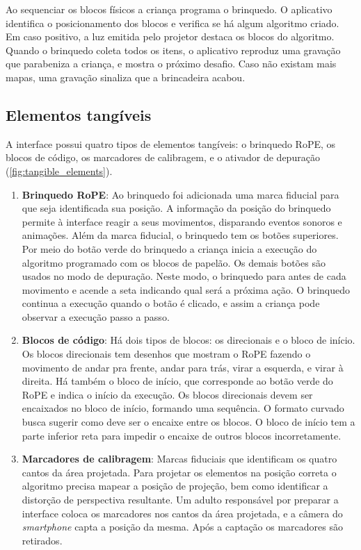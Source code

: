 Ao sequenciar os blocos físicos a criança programa o brinquedo. O aplicativo identifica o posicionamento dos blocos e verifica se há algum algoritmo criado. Em caso positivo, a luz emitida pelo projetor destaca os blocos do algoritmo. Quando o brinquedo coleta todos os itens, o aplicativo reproduz uma gravação que parabeniza a criança, e mostra o próximo desafio. Caso não existam mais mapas, uma gravação sinaliza que a brincadeira acabou.

\subsection{Elementos tangíveis}
A interface possui quatro tipos de elementos tangíveis: o brinquedo RoPE, os blocos de código, os marcadores de calibragem, e o ativador de depuração  (\autoref{fig:tangible_elements}).
\begin{enumerate}
\item \textbf{Brinquedo RoPE}: Ao brinquedo foi adicionada uma marca fiducial para que seja identificada sua posição. A informação da posição do brinquedo permite à interface reagir a seus movimentos, disparando eventos sonoros e animações. Além da marca fiducial, o brinquedo tem os botões superiores. Por meio do botão verde do brinquedo a criança inicia a execução do algoritmo programado com os blocos de papelão. Os demais botões são usados no modo de depuração. Neste modo, o brinquedo para antes de cada movimento e acende a seta indicando qual será a próxima ação. O brinquedo continua a execução quando o botão é clicado, e assim a criança pode observar a execução passo a passo.
\item \textbf{Blocos de código}:  Há dois tipos de blocos: os direcionais e o bloco de início. Os blocos direcionais tem desenhos que mostram o RoPE fazendo o movimento de andar pra frente, andar para trás, virar a esquerda, e virar à direita. Há também o bloco de início, que corresponde ao botão verde do RoPE e indica o início da execução. Os blocos direcionais devem ser encaixados no bloco de início, formando uma sequência. O formato curvado busca sugerir como deve ser o encaixe entre os blocos. O bloco de início  tem a parte inferior reta para impedir o encaixe de outros blocos incorretamente.
\item \textbf{Marcadores de calibragem}: Marcas fiduciais que identificam os quatro cantos da área projetada. Para projetar os elementos na posição correta o algoritmo precisa mapear a posição de projeção, bem como identificar a distorção de perspectiva resultante. Um adulto responsável por preparar a interface coloca os marcadores nos cantos da área projetada, e a câmera do \textit{smartphone} capta a posição da mesma. Após a captação os marcadores são retirados.

\end{enumerate}

